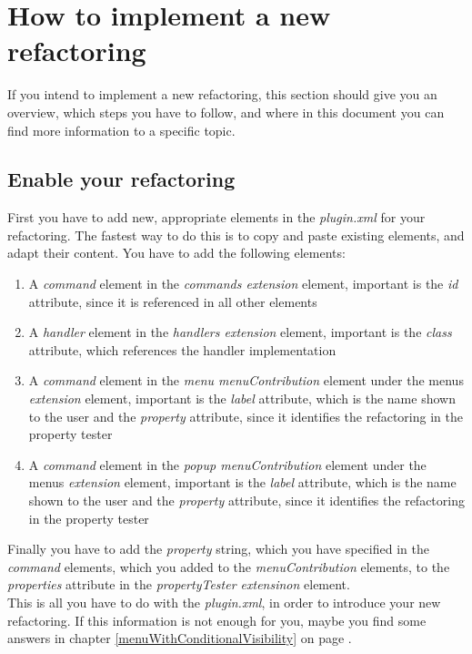 \documentclass[a4paper,10pt]{report}
\begin{document}
\section{How to implement a new refactoring}
If you intend to implement a new refactoring, this section should give you an overview, which steps you have to follow, and where in this document you can find more information to a specific topic.

\subsection{Enable your refactoring}
First you have to add new, appropriate elements in the {\it plugin.xml} for your refactoring. The fastest way to do this is to copy and paste existing elements, and adapt their content. You have to add the following elements:
   \begin{enumerate}
    \item A {\it command} element in the {\it commands extension} element, important is the {\it id} attribute, since it is referenced in all other elements
    \item A {\it handler} element in the {\it handlers extension} element, important is the {\it class} attribute, which references the handler implementation
    \item A {\it command} element in the {\it menu menuContribution} element under the menus {\it extension} element, important is the {\it label} attribute, which is the name shown to the user and the {\it property} attribute, since it identifies the refactoring in the property tester
    \item A {\it command} element in the {\it popup menuContribution} element under the menus {\it extension} element, important is the {\it label} attribute, which is the name shown to the user and the {\it property} attribute, since it identifies the refactoring in the property tester
   \end{enumerate}
Finally you have to add the {\it property} string, which you have specified in the {\it command} elements, which you added to the {\it menuContribution} elements, to the {\it properties} attribute in the {\it propertyTester extensinon} element.\\
This is all you have to do with the {\it plugin.xml}, in order to introduce your new refactoring.
If this information is not enough for you, maybe you find some answers in chapter \ref{menuWithConditionalVisibility} on page \pageref{menuWithConditionalVisibility}.
\end{document}
